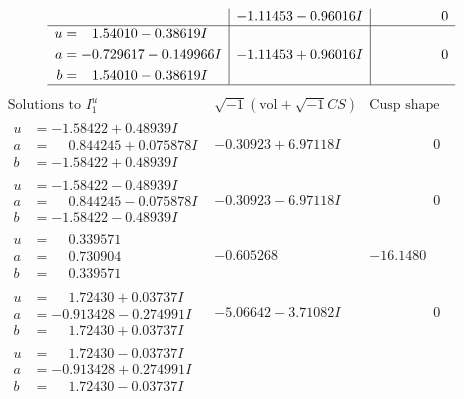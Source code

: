 \documentclass[1p]{elsarticle_modified}
\theoremstyle{definition}
\newcommand{\I}{\sqrt{-1}}
\begin{document}
$$\begin{array}{c|c|c}
 & -1.11453 - 0.96016 I & \phantom{-0.000000 } 0 \\ \hline\begin{aligned}
u &= \phantom{-}1.54010 - 0.38619 I \\
a &= -0.729617 - 0.149966 I \\
b &= \phantom{-}1.54010 - 0.38619 I\end{aligned}
 & -1.11453 + 0.96016 I & \phantom{-0.000000 } 0\\
 \hline 
 \end{array}$$\newpage$$\begin{array}{c|c|c}  
\text{Solutions to }I^u_{1}& \I (\text{vol} + \sqrt{-1}CS) & \text{Cusp shape}\\
 \hline 
\begin{aligned}
u &= -1.58422 + 0.48939 I \\
a &= \phantom{-}0.844245 + 0.075878 I \\
b &= -1.58422 + 0.48939 I\end{aligned}
 & -0.30923 + 6.97118 I & \phantom{-0.000000 } 0 \\ \hline\begin{aligned}
u &= -1.58422 - 0.48939 I \\
a &= \phantom{-}0.844245 - 0.075878 I \\
b &= -1.58422 - 0.48939 I\end{aligned}
 & -0.30923 - 6.97118 I & \phantom{-0.000000 } 0 \\ \hline\begin{aligned}
u &= \phantom{-}0.339571\phantom{ +0.000000I} \\
a &= \phantom{-}0.730904\phantom{ +0.000000I} \\
b &= \phantom{-}0.339571\phantom{ +0.000000I}\end{aligned}
 & -0.605268\phantom{ +0.000000I} & -16.1480\phantom{ +0.000000I} \\ \hline\begin{aligned}
u &= \phantom{-}1.72430 + 0.03737 I \\
a &= -0.913428 - 0.274991 I \\
b &= \phantom{-}1.72430 + 0.03737 I\end{aligned}
 & -5.06642 - 3.71082 I & \phantom{-0.000000 } 0 \\ \hline\begin{aligned}
u &= \phantom{-}1.72430 - 0.03737 I \\
a &= -0.913428 + 0.274991 I \\
b &= \phantom{-}1.72430 - 0.03737 I\end{aligned}

\end{array}$$
\end{document}
